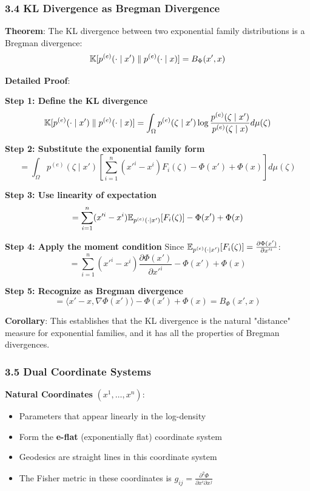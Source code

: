 \documentclass{amsart}
\let\originalmathbb\mathbb
\renewcommand{\mathbb}[1]{%
    \ifstrequal{#1}{1}{\mathbbm{#1}}{\originalmathbb{#1}}%
}
\theoremstyle{plain}
\theoremstyle{definition}
\theoremstyle{remark}
\begin{document}
\subsubsection{3.4 KL Divergence as Bregman Divergence}

\textbf{Theorem}: The KL divergence between two exponential family distributions is a Bregman divergence:
\[
\mathbb{K}[p^{(e)}(\cdot \mid x') \parallel p^{(e)}(\cdot \mid x)] = B_{\Phi}(x', x)
\]

\textbf{Detailed Proof}:

\textbf{Step 1: Define the KL divergence}
\[
\mathbb{K}[p^{(e)}(\cdot \mid x') \parallel p^{(e)}(\cdot \mid x)] = \int_{\Omega} p^{(e)}(\zeta \mid x') \log \frac{p^{(e)}(\zeta \mid x')}{p^{(e)}(\zeta \mid x)} d\mu(\zeta)
\]

\textbf{Step 2: Substitute the exponential family form}
\[
= \int_{\Omega} p^{(e)}(\zeta \mid x') \left[ \sum_{i=1}^n (x'^i - x^i) F_i(\zeta) - \Phi(x') + \Phi(x) \right] d\mu(\zeta)
\]

\textbf{Step 3: Use linearity of expectation}
\[
= \sum_{i=1}^n (x'^i - x^i) \mathbb{E}_{p^{(e)}(\cdot \mid x')}[F_i(\zeta)] - \Phi(x') + \Phi(x)
\]

\textbf{Step 4: Apply the moment condition}
Since $\mathbb{E}_{p^{(e)}(\cdot \mid x')}[F_i(\zeta)] = \frac{\partial \Phi(x')}{\partial x'^i}$:
\[
= \sum_{i=1}^n (x'^i - x^i) \frac{\partial \Phi(x')}{\partial x'^i} - \Phi(x') + \Phi(x)
\]

\textbf{Step 5: Recognize as Bregman divergence}
\[
= \langle x' - x, \nabla \Phi(x') \rangle - \Phi(x') + \Phi(x) = B_{\Phi}(x', x)
\]

\textbf{Corollary}: This establishes that the KL divergence is the natural "distance" measure for exponential families, and it has all the properties of Bregman divergences.

\subsubsection{3.5 Dual Coordinate Systems}

\textbf{Natural Coordinates} $(x^1, \ldots, x^n)$:

\begin{itemize}
	\item Parameters that appear linearly in the log-density
	\item Form the \textbf{e-flat} (exponentially flat) coordinate system
	\item Geodesics are straight lines in this coordinate system
	\item The Fisher metric in these coordinates is $g_{ij} = \frac{\partial^2 \Phi}{\partial x^i \partial x^j}$
\end{itemize}
\end{document}
